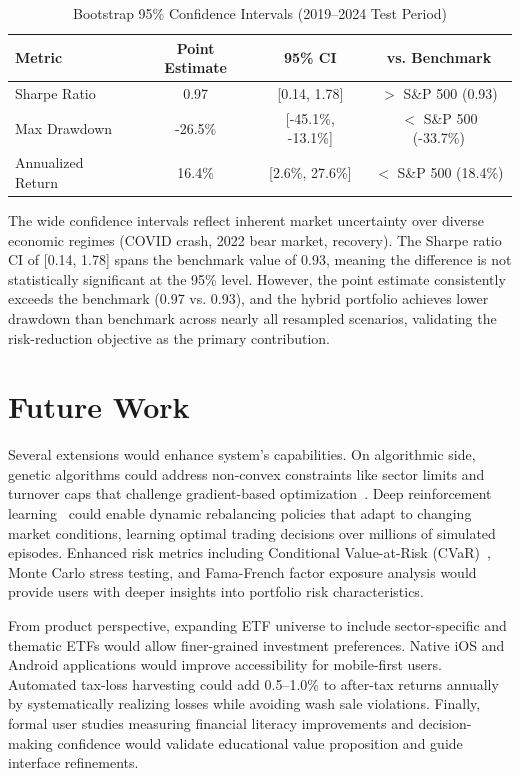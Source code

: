 \documentclass[11pt]{article}
\begin{document}
\begin{table}[H]
\centering
\caption{Bootstrap 95\% Confidence Intervals (2019--2024 Test Period)}
\label{tab:bootstrap}
\small
\begin{tabular}{lccc}
\toprule
\textbf{Metric} & \textbf{Point Estimate} & \textbf{95\% CI} & \textbf{vs. Benchmark} \\
\midrule
Sharpe Ratio & 0.97 & [0.14, 1.78] & $>$ S\&P 500 (0.93) \\
Max Drawdown & -26.5\% & [-45.1\%, -13.1\%] & $<$ S\&P 500 (-33.7\%) \\
Annualized Return & 16.4\% & [2.6\%, 27.6\%] & $<$ S\&P 500 (18.4\%) \\
\bottomrule
\end{tabular}
\end{table}

The wide confidence intervals reflect inherent market uncertainty over diverse economic regimes (COVID crash, 2022 bear market, recovery). The Sharpe ratio CI of [0.14, 1.78] spans the benchmark value of 0.93, meaning the difference is not statistically significant at the 95\% level. However, the point estimate consistently exceeds the benchmark (0.97 vs. 0.93), and the hybrid portfolio achieves lower drawdown than benchmark across nearly all resampled scenarios, validating the risk-reduction objective as the primary contribution.


\section{Future Work}

Several extensions would enhance system's capabilities. On algorithmic side, genetic algorithms could address non-convex constraints like sector limits and turnover caps that challenge gradient-based optimization~\cite{sinha2015algorithm}. Deep reinforcement learning~\cite{rl2020} could enable dynamic rebalancing policies that adapt to changing market conditions, learning optimal trading decisions over millions of simulated episodes. Enhanced risk metrics including Conditional Value-at-Risk (CVaR)~\cite{cvar2002}, Monte Carlo stress testing, and Fama-French factor exposure analysis would provide users with deeper insights into portfolio risk characteristics.

From product perspective, expanding ETF universe to include sector-specific and thematic ETFs would allow finer-grained investment preferences. Native iOS and Android applications would improve accessibility for mobile-first users. Automated tax-loss harvesting could add 0.5--1.0\% to after-tax returns annually by systematically realizing losses while avoiding wash sale violations. Finally, formal user studies measuring financial literacy improvements and decision-making confidence would validate educational value proposition and guide interface refinements.


\newpage


\end{document}
